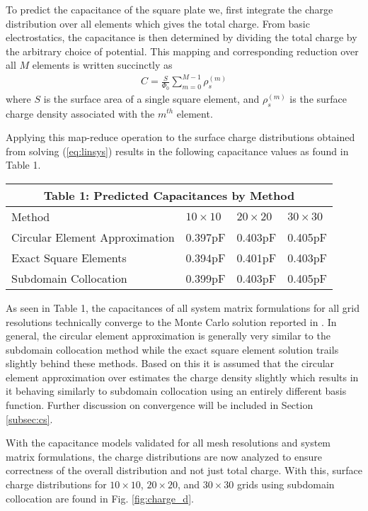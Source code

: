To predict the capacitance of the square plate we, first integrate the charge distribution over all elements which gives the total charge. From basic electrostatics, the capacitance is then determined by dividing the total charge by the arbitrary choice of potential. This mapping and corresponding reduction over all $M$ elements is written succinctly as 
\begin{align}
	C=\frac{S}{\Phi_0}\sum_{m=0}^{M-1}\rho_{s}^{(m)}
\end{align}
where $S$ is the surface area of a single square element, and $\rho_{s}^{(m)}$ is the surface charge density associated with the $m^{th}$ element.

Applying this map-reduce operation to the surface charge distributions obtained from solving (\ref{eq:linsys}) results in the following capacitance values as found in Table 1.

\begin{table}[h!]
	\centering
\begin{tabular}{ |p{2cm}||p{1cm}|p{1cm}|p{1cm}|}
	\multicolumn{4}{c}{Table 1: Predicted Capacitances by Method} \\
	\hline
	Method & $10\times10$ & $20\times20$ & $30\times30$ \\
	\hline
	Circular Element Approximation   & 0.397pF &0.403pF & 0.405pF\\
	\hline
	Exact Square Elements& 0.394pF& 0.401pF & 0.403pF\\
	\hline
	Subdomain Collocation&0.399pF & 0.403pF & 0.405pF \\
	\hline
   \end{tabular}
   \label{tab:capvals}
\end{table}

As seen in Table 1, the capacitances of all system matrix formulations for all grid resolutions technically converge to the Monte Carlo solution reported in \cite{randomwalk}. In general, the circular element approximation is generally very similar to the subdomain collocation method while the exact square element solution trails slightly behind these methods. Based on this it is assumed that the circular element approximation over estimates the charge density slightly which results in it behaving similarly to subdomain collocation using an entirely different basis function. Further discussion on convergence will be included in Section \ref{subsec:cs}. 

With the capacitance models validated for all mesh resolutions and system matrix formulations, the charge distributions are now analyzed to ensure correctness of the overall distribution and not just total charge. With this, surface charge distributions for $10\times10$, $20\times20$, and $30\times30$ grids using subdomain collocation are found in Fig. \ref{fig:charge_d}. 

